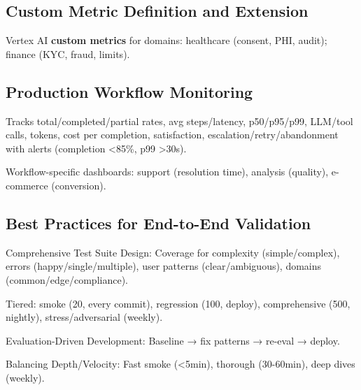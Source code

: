 \begin{TNtwocol}
\subsection*{Custom Metric Definition and Extension}

Vertex AI \textbf{custom metrics} for domains: healthcare (consent, PHI, audit); finance (KYC, fraud, limits).
​

\subsection*{Production Workflow Monitoring}

Tracks total/completed/partial rates, avg steps/latency, p50/p95/p99, LLM/tool calls, tokens, cost per completion, satisfaction, escalation/retry/abandonment with alerts (completion <85\%, p99 >30s).
​

Workflow-specific dashboards: support (resolution time), analysis (quality), e-commerce (conversion).
​

\subsection*{Best Practices for End-to-End Validation}

Comprehensive Test Suite Design: Coverage for complexity (simple/complex), errors (happy/single/multiple), user patterns (clear/ambiguous), domains (common/edge/compliance).
​

Tiered: smoke (20, every commit), regression (100, deploy), comprehensive (500, nightly), stress/adversarial (weekly).
​

Evaluation-Driven Development: Baseline → fix patterns → re-eval → deploy.
​

Balancing Depth/Velocity: Fast smoke (<5min), thorough (30-60min), deep dives (weekly).
​

\end{TNtwocol}